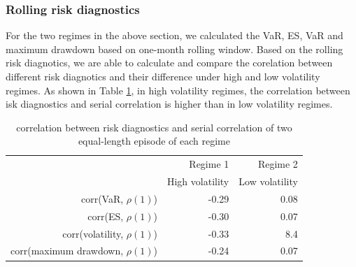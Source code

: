 \documentclass[12pt]{article}
\begin{document}
\subsubsection{Rolling risk diagnostics}

For the two regimes in the above section, we calculated the VaR, ES, VaR and maximum drawdown based on one-month rolling window. Based on the rolling risk diagnotics, we are able to calculate and compare the corelation between different risk diagnotics and their difference under high and low volatility regimes. As shown in Table \ref{table:corr_risk_serial_regime}, in high volatility regimes, the correlation between isk diagnostics and serial correlation is higher than in low volatility regimes.

\begin{table}[!h]
\caption{correlation between risk diagnostics and serial correlation of two equal-length episode of each regime} 
\centering 
\begin{tabular}{| r | r | r |} 
 \hline
& Regime 1 & Regime 2 \\
& High volatility & Low volatility \\
 \hline 
corr(VaR, $\rho(1)$)  & -0.29 & 0.08 \\
corr(ES, $\rho(1)$)   & -0.30 & 0.07 \\
corr(volatility, $\rho(1)$)  & -0.33 & 8.4 \\
corr(maximum drawdown, $\rho(1)$)  & -0.24 & 0.07 \\
 \hline
\end{tabular}
\label{table:corr_risk_serial_regime}
\end{table}

\iffalse
\end{document}
